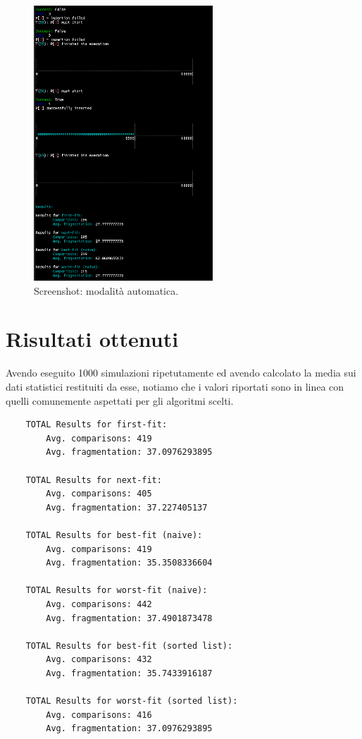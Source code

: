 \documentclass[12pt]{report}
\begin{document}
            \begin{figure}[H]
                \caption{Screenshot: modalità automatica.}
                \centering
                \includegraphics[width=0.6\textwidth]{scr2}
            \end{figure}

        \section{Risultati ottenuti}

            Avendo eseguito 1000 simulazioni ripetutamente ed avendo calcolato la media sui dati statistici restituiti da esse, notiamo che i valori riportati sono in linea con quelli comunemente aspettati per gli algoritmi scelti.

            \begin{verbatim}
    TOTAL Results for first-fit:
        Avg. comparisons: 419
        Avg. fragmentation: 37.0976293895

    TOTAL Results for next-fit:
        Avg. comparisons: 405
        Avg. fragmentation: 37.227405137

    TOTAL Results for best-fit (naive):
        Avg. comparisons: 419
        Avg. fragmentation: 35.3508336604

    TOTAL Results for worst-fit (naive):
        Avg. comparisons: 442
        Avg. fragmentation: 37.4901873478

    TOTAL Results for best-fit (sorted list):
        Avg. comparisons: 432
        Avg. fragmentation: 35.7433916187

    TOTAL Results for worst-fit (sorted list):
        Avg. comparisons: 416
        Avg. fragmentation: 37.0976293895
            \end{verbatim}
\end{document}
